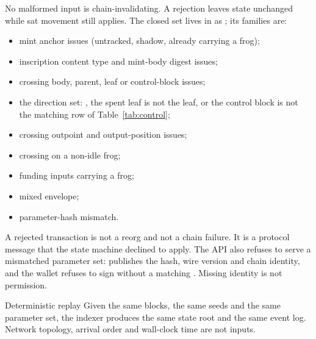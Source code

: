 No malformed input is chain-invalidating. A rejection leaves state unchanged
while sat movement still applies. The closed set lives in
 as ; its families
are:
\begin{itemize}[leftmargin=1.4em,itemsep=0.2em]
  \item mint anchor issues (untracked, shadow, already carrying a frog);
  \item inscription content type and mint-body digest issues;
  \item crossing body, parent, leaf or control-block issues;
  \item the direction set: , the spent leaf is not the
         leaf, or the control block is not the matching row of
        Table~\ref{tab:control};
  \item crossing outpoint and output-position issues;
  \item crossing on a non-idle frog;
  \item funding inputs carrying a frog;
  \item mixed  envelope;
  \item parameter-hash mismatch.
\end{itemize}

A rejected transaction is not a reorg and not a chain failure. It is a
protocol message that the state machine declined to apply. The API also
refuses to serve a mismatched parameter set:  publishes
the hash, wire version and chain identity, and the wallet refuses to sign
without a matching . Missing identity is not permission.

\begin{invariant}{Deterministic replay}
Given the same blocks, the same seeds and the same parameter set, the
indexer produces the same state root and the same event log. Network
topology, arrival order and wall-clock time are not inputs.
\end{invariant}
